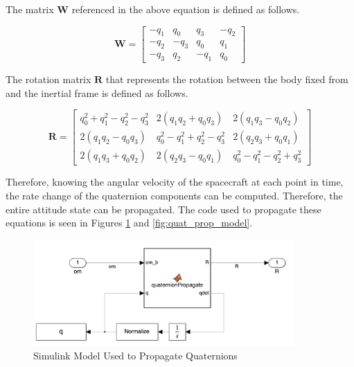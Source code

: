 The matrix $\boldsymbol{W}$ referenced in the above equation is defined as follows.

\begin{equation*}
    \boldsymbol{W} = \begin{bmatrix}
        -q_1 & q_0 & q_3 & -q_2 \\
        -q_2 & -q_3 & q_0 & q_1 \\
        -q_3 & q_2 & -q_1 & q_0
    \end{bmatrix}
\end{equation*}

The rotation matrix $\boldsymbol{R}$ that represents the rotation between the body fixed from and the inertial frame is defined as follows.

\begin{equation*}
    \boldsymbol{R} = \begin{bmatrix}
        q_0^2 + q_1^2 - q_2^2 - q_3^2 & 2(q_1q_2 + q_0q_3) & 2(q_1q_3 - q_0q_2) \\
        2(q_1q_2 - q_0q_3) & q_0^2 - q_1^2 + q_2^2 - q_3^2 & 2(q_2q_3 + q_0q_1) \\
        2(q_1q_3 + q_0q_2) & 2(q_2q_3 - q_0q_1) & q_0^2 - q_1^2 - q_2^2 + q_3^2
    \end{bmatrix}
\end{equation*}

Therefore, knowing the angular velocity of the spacecraft at each point in time, the rate change of the quaternion components can be computed. Therefore, the entire attitude state can be propagated. The code used to propagate these equations is seen in Figures \ref{fig:simulink_quats} and \ref{fig:quat_prop_model}.

\begin{figure}[H]
    \centering
    \captionsetup{justification = centering}
    \includegraphics[width = 10cm]{Images/simulink_quat.png}
    \caption{Simulink Model Used to Propagate Quaternions}
    \label{fig:simulink_quats}
\end{figure}

